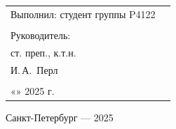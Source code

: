 \begin{titlepage}
    \begin{flushright}
        \begin{minipage}{0.5\textwidth}
            \small
            \begin{tabular}{@{}ll@{}}
                Выполнил: студент группы P4122 & \\[6pt]
                \underline{\hspace{4cm}} & \\[12pt]
                Руководитель: & \\[3pt]
                ст. преп., к.т.н. & \\[3pt]
                И.\,А.~Перл & \\[6pt]
                \underline{\hspace{4cm}} & \\[6pt]
                «\underline{\hspace{1cm}}» \underline{\hspace{3cm}} 2025 г.
            \end{tabular}
        \end{minipage}
    \end{flushright}

    \vfill

    \begin{center}
        \small
        Санкт-Петербург --- 2025
    \end{center}

\end{titlepage}
